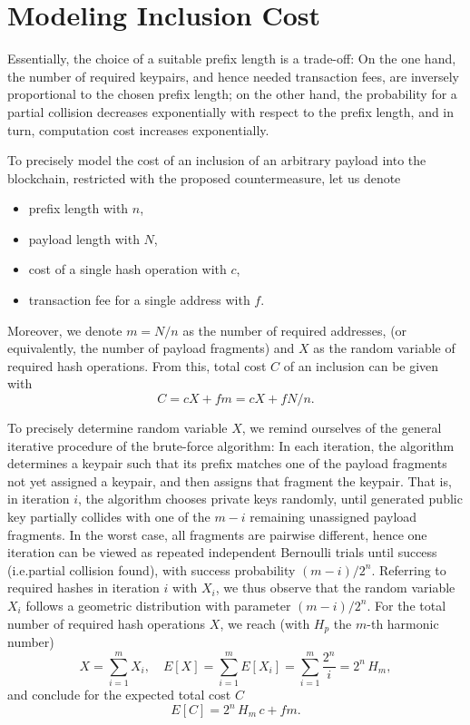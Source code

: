 \documentclass[a4paper,11pt,titlepage]{scrbook}
\begin{document}
\section{Modeling Inclusion Cost}

Essentially, the choice of a suitable prefix length is a trade-off:
On the one hand, the number of required keypairs, and hence needed transaction fees, are inversely proportional to the chosen prefix length;
on the other hand, the probability for a partial collision decreases exponentially with respect to the prefix length, and in turn, computation cost increases exponentially.

To precisely model the cost of an inclusion of an arbitrary payload into the blockchain, restricted with the proposed countermeasure, let us denote 
\begin{itemize}[noitemsep]
    \item prefix length with $n$,
    \item payload length with $N$,
    \item cost of a single hash operation with $c$,
    \item transaction fee for a single address with $f$.
\end{itemize}
Moreover, we denote $m=N/n$ as the number of required addresses, (or equivalently, the number of payload fragments) and $X$ as the random variable of required hash operations.
From this, total cost $C$ of an inclusion can be given with
\[ C =  c X + fm = c X + fN/n . \]

To precisely determine random variable $X$, we remind ourselves of the general iterative procedure of the brute-force algorithm:
In each iteration, the algorithm determines a keypair such that its prefix matches one of the payload fragments not yet assigned a keypair, and then assigns that fragment the keypair.
That is, in iteration $i$, the algorithm chooses private keys randomly, until generated public key partially collides with one of the $m-i$ remaining unassigned payload fragments.
In the worst case, all fragments are pairwise different, hence one iteration can be viewed as repeated independent Bernoulli trials until success (i.e.\@ partial collision found), with success probability $(m-i)/2^n$.  
Referring to required hashes in iteration $i$ with $X_i$, we thus observe that the random variable $X_i$ follows a geometric distribution with parameter $(m-i)/2^n$.
For the total number of required hash operations $X$, we reach (with $H_p$ the $m$-th harmonic number)
\[ X = \sum_{i=1}^{m} X_i, \quad E[X] = \sum_{i=1}^{m} E[X_i] = \sum_{i=1}^{m}\frac{2^n}{i} = 2^n\, H_m, \]
and conclude for the expected total cost $C$
\begin{equation}
    E[C] = 2^n\, H_m\,c + fm.\label{eq:totalcost}
\end{equation}
\end{document}

